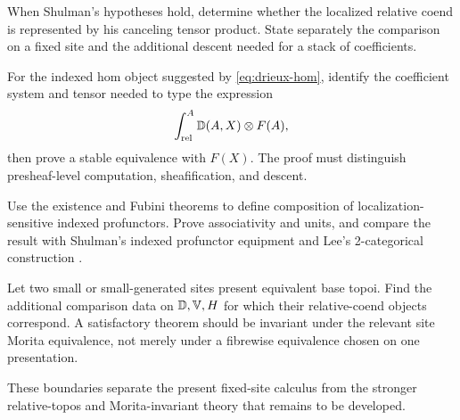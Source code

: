 \begin{problem}
\label{prob:shulman-comparison}
When Shulman's hypotheses hold, determine whether the localized relative
coend is represented by his canceling tensor product.  State separately the
comparison on a fixed site and the additional descent needed for a stack of
coefficients.
\end{problem}

\begin{problem}
\label{prob:coyoneda}
For the indexed hom object suggested by \cref{eq:drieux-hom}, identify the
coefficient system and tensor needed to type the expression
\[
  \int^{A}_{\mathrm{rel}} \mathbb{D}(A,X)\otimes F(A),
\]
then prove a stable equivalence with \(F(X)\).  The proof must distinguish
presheaf-level computation, sheafification, and descent.
\end{problem}

\begin{problem}
\label{prob:relative-prof}
Use the existence and Fubini theorems to define composition of
localization-sensitive indexed profunctors.  Prove associativity and units,
and compare the result with Shulman's indexed profunctor equipment and Lee's
2-categorical construction \cite{Lee2023}.
\end{problem}

\begin{problem}
\label{prob:site-invariance}
Let two small or small-generated sites present equivalent base topoi.  Find
the additional comparison data on \(\mathbb{D},\mathbb{V},H\) for which their relative-coend
objects correspond.  A satisfactory theorem should be invariant under the
relevant site Morita equivalence, not merely under a fibrewise equivalence
chosen on one presentation.
\end{problem}

These boundaries separate the present fixed-site calculus from the stronger
relative-topos and Morita-invariant theory that remains to be developed.
